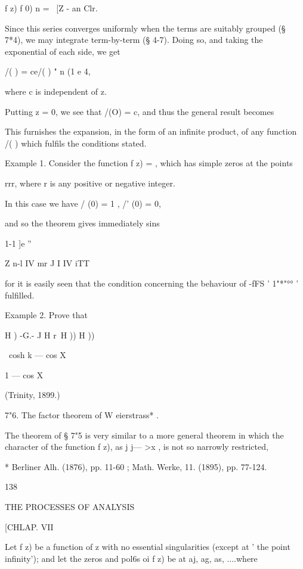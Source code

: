f z) f 0) n = \ [Z - an Clr.

Since this series converges uniformly when the terms are suitably
grouped (§ 7*4), we may integrate term-by-term (§ 4-7). Doing so, and
taking the exponential of each side, we get

/( ) = ce/( ) " n (1 e 4,

where c is independent of z.

Putting z = 0, we see that /(O) = c, and thus the general result
becomes

This furnishes the expansion, in the form of an infinite product, of
any function /( ) which fulfils the conditions stated.

Example 1. Consider the function f z) = , which has simple zeros at
the points

rrr, where r is any positive or negative integer.

In this case we have / (0) = 1 , /' (0) = 0,

and so the theorem gives immediately sins






1-1 ]e ''

Z n-l IV mr J I IV iTT



for it is easily seen that the condition concerning the behaviour of
-fFS ' 1"*"°° ' fulfilled.

Example 2. Prove that

H ) -G.- J H r\ H )) H ))

\ cosh k — cos X

1 — cos X

(Trinity, 1899.)

7"6. The factor theorem of W eierstrass* .

The theorem of § 7"5 is very similar to a more general theorem in
which the character of the function f z), as j j— >x , is not so
narrowly restricted,

* Berliner Alh. (1876), pp. 11-60 ; Math. Werke, 11. (1895), pp.
77-124.



138



THE PROCESSES OF ANALYSIS



[CHLAP. VII



Let f z) be a function of z with no essential singularities (except at
' the point infinity'); and let the zeros and pol6s oi f z) be at aj,
ag, as, ....where

